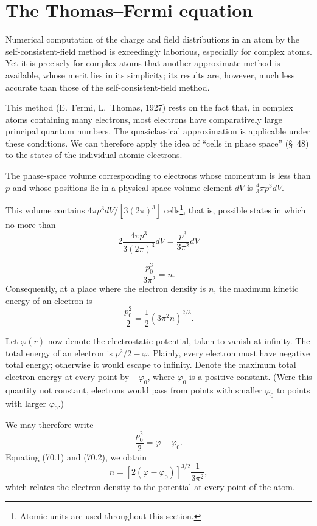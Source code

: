 \section{The Thomas--Fermi equation}

Numerical computation of the charge and field distributions in an atom by the self-consistent-field method is exceedingly laborious, especially for complex atoms. Yet it is precisely for complex atoms that another approximate method is available, whose merit lies in its simplicity; its results are, however, much less accurate than those of the self-consistent-field method.

This method (E.~Fermi, L.~Thomas, 1927) rests on the fact that, in complex atoms containing many electrons, most electrons have comparatively large principal quantum numbers. The quasiclassical approximation is applicable under these conditions. We can therefore apply the idea of ``cells in phase space'' (\S~48) to the states of the individual atomic electrons.

The phase-space volume corresponding to electrons whose momentum is less than $p$ and whose positions lie in a physical-space volume element $dV$ is $\frac43\pi p^3dV$.

This volume contains $4\pi p^3dV/[3(2\pi)^3]$ cells\footnote{Atomic units are used throughout this section.}, that is, possible states in which no more than
\[2\frac{4\pi p^3}{3(2\pi)^3}dV=\frac{p^3}{3\pi^2}dV\]

\[\frac{p_0^3}{3\pi^2}=n.\]
Consequently, at a place where the electron density is $n$, the maximum kinetic energy of an electron is
\begin{equation}\frac{p_0^2}{2}=\frac12(3\pi^2n)^{2/3}.\tag{70.1}\end{equation}

Let $\varphi(r)$ now denote the electrostatic potential, taken to vanish at infinity. The total energy of an electron is $p^2/2-\varphi$. Plainly, every electron must have negative total energy; otherwise it would escape to infinity. Denote the maximum total electron energy at every point by $-\varphi_0$, where $\varphi_0$ is a positive constant. (Were this quantity not constant, electrons would pass from points with smaller $\varphi_0$ to points with larger $\varphi_0$.)

We may therefore write
\begin{equation}\frac{p_0^2}{2}=\varphi-\varphi_0.\tag{70.2}\end{equation}
Equating (70.1) and (70.2), we obtain
\begin{equation}n=[2(\varphi-\varphi_0)]^{3/2}\frac1{3\pi^2},\tag{70.3}\end{equation}
which relates the electron density to the potential at every point of the atom.

